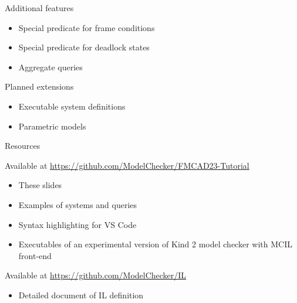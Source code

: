 \documentclass[10pt,aspectratio=149]{beamer}
\begin{document}

\begin{frame}{Additional features}
\large

\begin{itemize}\setlength{\itemsep}{3ex}

\item Special predicate for \alert{frame conditions}
 
\item Special predicate for \alert{deadlock states}
 
\item \alert{Aggregate} queries 
\end{itemize}

\end{frame}


\begin{frame}{Planned extensions}
\large

\begin{itemize}\setlength{\itemsep}{3ex}

\item \alert{Executable} system definitions 
 
\item \alert{Parametric} models
 
 \end{itemize}

\end{frame}


\begin{frame}{Resources}

Available at \url{https://github.com/ModelChecker/FMCAD23-Tutorial}
\smallskip

\begin{itemize}
\item These slides
\item Examples of systems and queries
\item Syntax highlighting for VS Code 
\item Executables of an experimental version of Kind 2 model checker with MCIL front-end
\end{itemize}
\vspace{3ex}

Available at \url{https://github.com/ModelChecker/IL}
\smallskip

\begin{itemize}
\item Detailed document of IL definition
\end{itemize}

\end{frame}
\end{document}
